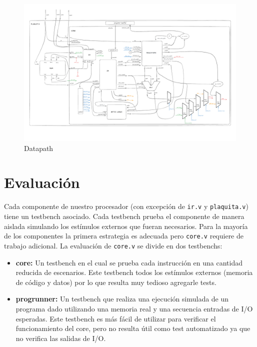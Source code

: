 \documentclass{article}
\begin{document}
\begin{figure}
    \centering
    \includegraphics[width=20cm,angle=90]{datapath.pdf}
    \caption{Datapath}
\end{figure}

\newpage

\section{Evaluación}
Cada componente de nuestro procesador (con excepción de \texttt{ir.v} y \texttt{plaquita.v}) tiene un testbench asociado. Cada testbench prueba el componente de manera aislada simulando los estímulos externos que fueran necesarios.
Para la mayoría de los componentes la primera estrategia es adecuada pero \texttt{core.v} requiere de trabajo adicional. La evaluación de \texttt{core.v} se divide en dos testbenchs:
\begin{itemize}
    \item \textbf{core:} Un testbench en el cual se prueba cada instrucción en una cantidad reducida de escenarios. Este testbench todos los estímulos externos (memoria de código y datos) por lo que resulta muy tedioso agregarle tests.
    \item \textbf{progrunner:} Un testbench que realiza una ejecución simulada de un programa dado utilizando una memoria real y una secuencia entradas de I/O esperadas. Este testbench es más fácil de utilizar para verificar el funcionamiento del core, pero no resulta útil como test automatizado ya que no verifica las salidas de I/O.
\end{itemize}
\end{document}
